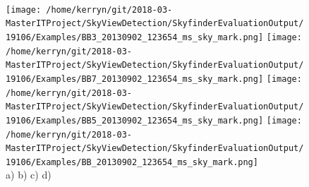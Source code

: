 \documentclass{article}
\begin{document}
\begin{figure}
\\
\texttt{[image: /home/kerryn/git/2018-03-MasterITProject/SkyViewDetection/SkyfinderEvaluationOutput/19106/Examples/BB3\_20130902\_123654\_ms\_sky\_mark.png]} \hfil
\texttt{[image: /home/kerryn/git/2018-03-MasterITProject/SkyViewDetection/SkyfinderEvaluationOutput/19106/Examples/BB7\_20130902\_123654\_ms\_sky\_mark.png]} \hfil
\texttt{[image: /home/kerryn/git/2018-03-MasterITProject/SkyViewDetection/SkyfinderEvaluationOutput/19106/Examples/BB5\_20130902\_123654\_ms\_sky\_mark.png]} \hfil
\texttt{[image: /home/kerryn/git/2018-03-MasterITProject/SkyViewDetection/SkyfinderEvaluationOutput/19106/Examples/BB\_20130902\_123654\_ms\_sky\_mark.png]} 
\\
\scriptsize{a)}\hfil
\scriptsize{b)}\hfil
\scriptsize{c)}\hfil
\scriptsize{d)}\hfil

\end{figure} 



\clearpage %
\end{document}
